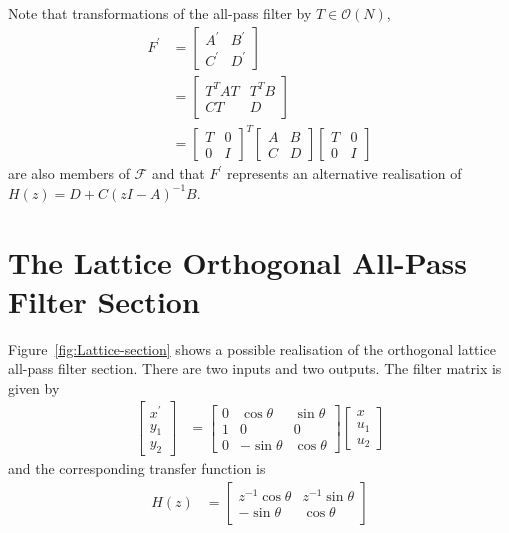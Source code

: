 \documentclass[a4paper,twoside,10pt,english]{report}
\begin{document}
Note that transformations of the all-pass filter by 
$T\in\mathcal{O}\left(N\right)$,
\begin{align*}
F^{\prime} &= \left[\begin{array}{cc}
A^{\prime} & B^{\prime}\\
C^{\prime} & D^{\prime}
\end{array}\right]\\
 &= \left[\begin{array}{l|l}
T^{T}AT & T^{T}B\\ \hline
CT & D
\end{array}\right]\\
 &= \left[\begin{array}{cc}
T & 0\\
0 & I
\end{array}\right]^{T}\left[\begin{array}{cc}
A & B\\
C & D
\end{array}\right]\left[\begin{array}{cc}
T & 0\\
0 & I
\end{array}\right]
\end{align*}
are also members of $\mathcal{F}$ and that $F^{\prime}$ represents
an alternative realisation of $H{\left(z\right)=D+C\left(zI-A\right)}^{-1}B$.
\section{The Lattice Orthogonal All-Pass Filter Section}
Figure~\ref{fig:Lattice-section} shows a possible realisation of the
orthogonal lattice all-pass filter section. There are two inputs and two 
outputs. The filter matrix is given by
\begin{align*}
\left[\begin{array}{c}
x^{\prime}\\
y_{1}\\
y_{2}
\end{array}\right] &= \left[\begin{array}{ccc}
0 &  \cos\theta  & \sin\theta\\
1 &  0           & 0\\
0 &  -\sin\theta & \cos\theta
\end{array}\right]\left[\begin{array}{c}
x\\
u_{1}\\
u_{2}
\end{array}\right]
\end{align*}
and the corresponding transfer function is
\begin{align*}
H\left(z\right) &= \left[\begin{array}{cc}
z^{-1}\cos\theta & z^{-1}\sin\theta\\
-\sin\theta & \cos\theta
\end{array}\right]
\end{align*}
\end{document}
